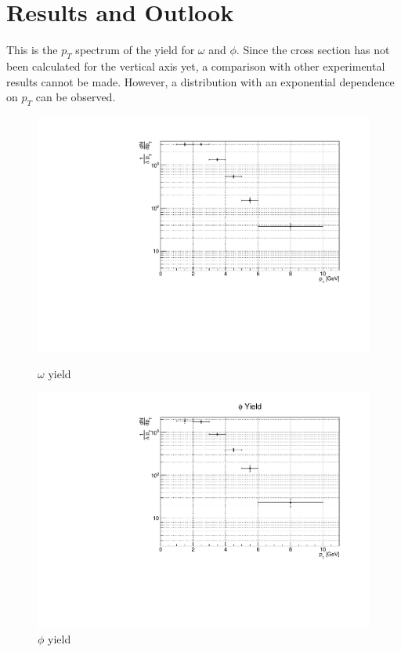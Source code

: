 \newpage
\clearpage
\section{Results and Outlook}
    This is the $p_T$ spectrum of the yield for $\omega$ and $\phi$. Since the cross section has not been calculated for the vertical axis yet, a comparison with other experimental results cannot be made. However, a distribution with an exponential dependence on $p_T$ can be observed.
    \begin{figure}[htbp]
        \centering
        \begin{minipage}{0.45\textwidth} %
            \centering
            \includegraphics[width=\textwidth]{fig/4_omega_yield.pdf} %
            \caption{$\omega$ yield}
            \label{fig:omega_yield}
        \end{minipage}
        \hfill
        \begin{minipage}{0.45\textwidth}
            \centering
            \includegraphics[width=\textwidth]{fig/4_phi_yield.pdf} %
            \caption{$\phi$ yield}
            \label{fig:phi_yield}
        \end{minipage}
    \end{figure}
